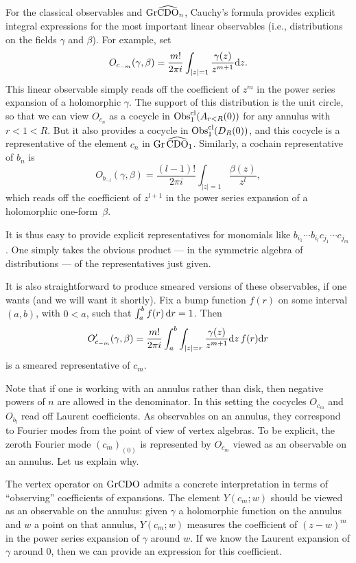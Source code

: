 For the classical observables and ${\rm Gr} \widehat{\rm CDO}_n$,
Cauchy's formula provides explicit integral expressions for the most important linear observables
(i.e., distributions on the fields $\gamma$ and $\beta$).
For example, set 
\[
O_{c_{-m}}(\gamma,\beta) = \frac{m!}{2 \pi i} \int_{|z| = 1} \frac{\gamma(z)}{z^{m+1}} {\rm d} z.
\]
This linear observable simply reads off the coefficient of $z^m$ in the power series expansion of a holomorphic $\gamma$.
The support of this distribution is the unit circle, 
so that we can view $O_{c_n}$ as a cocycle in ${\rm Obs}^{{\rm cl}}_1(A_{r<R}(0))$ for any annulus with $r < 1 < R$.
But it also provides a cocycle in ${\rm Obs}^{{\rm cl}}_1(D_R(0))$, 
and this cocycle is a representative of the element $c_n$ in ${\rm Gr}\, \widehat{\rm CDO}_1$.
Similarly, a cochain representative of $b_n$ is
\[
O_{b_{-l}}(\gamma,\beta) = \frac{(l-1)!}{2 \pi i} \int_{|z| = 1} \frac{\beta(z)}{z^{l}},
\]
which reads off the coefficient of $z^{l+1}$ in the power series expansion of a holomorphic one-form~$\beta$.

It is thus easy to provide explicit representatives for monomials like $b_{i_1} \cdots b_{i_l} c_{j_1} \cdots c_{j_m}$.
One simply takes the obvious product --- in the symmetric algebra of distributions --- of the representatives just given.

It is also straightforward to produce smeared versions of these observables, if one wants 
(and we will want it shortly).
Fix a bump function $f(r)$ on some interval $(a,b)$, with $0 < a$, 
such that $\int_a^b f(r) \, {\rm d} r = 1$.
Then
\[
O'_{c_{-m}}(\gamma,\beta) = \frac{m!}{2 \pi i}\int_a^b \int_{|z| = r} \frac{\gamma(z)}{z^{m+1}} {\rm d} z \, f(r) {\rm d} r
\]
is a smeared representative of $c_m$.

Note that if one is working with an annulus rather than disk, then negative powers of $n$ are allowed in the denominator.
In this setting the cocycles $O_{c_m}$ and $O_{b_l}$ read off Laurent coefficients.
As observables on an annulus, they correspond to Fourier modes from the point of view of vertex algebras.
To be explicit, the zeroth Fourier mode $(c_m)_{(0)}$ is represented by $O_{c_m}$ viewed as an observable on an annulus.
Let us explain why.

The vertex operator on ${\rm Gr}{\rm CDO}$ admits a concrete interpretation in terms of ``observing'' coefficients of expansions.
The element $Y(c_m;w)$ should be viewed as an observable on the annulus:
given $\gamma$ a holomorphic function on the annulus and $w$ a point on that annulus, 
$Y(c_m;w)$ measures the coefficient of $(z-w)^m$ in the power series expansion of $\gamma$ around $w$.
If we know the Laurent expansion of $\gamma$ around $0$, then we can provide an expression for this coefficient.

